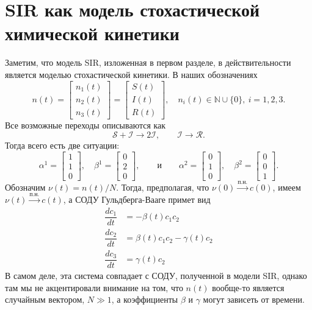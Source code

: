 \documentclass[12pt]{article}
\begin{document}
\section*{SIR как модель стохастической химической кинетики}

Заметим, что модель SIR, изложенная в первом разделе, в действительности является моделью стохастической кинетики. В наших обозначениях 
\[ n(t) = \begin{bmatrix} n_1(t) \\ n_2(t) \\ n_3(t) \end{bmatrix} = \begin{bmatrix} S(t) \\ I(t) \\ R(t) \end{bmatrix}, \quad n_i(t) \in \mathbb{N} \cup \{0\}, \ i = 1, 2, 3. \]
Все возможные переходы описываются как
\[ \mathcal{S} + \mathcal{I} \to 2 \mathcal{I}, \qquad \mathcal{I} \to \mathcal{R}. \]
Тогда всего есть две ситуации:
\[ \alpha^1 = \begin{bmatrix} 1 \\ 1 \\ 0 \end{bmatrix}, \quad \beta^1 = \begin{bmatrix} 0 \\ 2 \\ 0 \end{bmatrix}, \qquad \text{и} \qquad \alpha^2 = \begin{bmatrix} 0 \\ 1 \\ 0 \end{bmatrix}, \quad \beta^2 = \begin{bmatrix} 0 \\ 0 \\ 1 \end{bmatrix}. \]
Обозначим $\nu(t) = n(t)/N$. Тогда, предполагая, что $\nu(0) \xrightarrow{\text{п.н.}} c(0)$, имеем $\nu(t) \xrightarrow{\text{п.н.}} c(t)$, а СОДУ Гульдберга-Вааге примет вид
\begin{align*}
    \dfrac{dc_1}{dt} &= - \beta(t) c_1 c_2 \\
    \dfrac{dc_2}{dt} &= \beta(t) c_1 c_2 - \gamma(t) c_2 \\
    \dfrac{dc_3}{dt} &= \gamma(t) c_2
\end{align*}
В самом деле, эта система совпадает с СОДУ, полученной в модели SIR, однако там мы не акцентировали внимание на том, что $n(t)$ вообще-то является случайным вектором, $N \gg 1$, а коэффициенты $\beta$ и $\gamma$ могут зависеть от времени.
\end{document}
